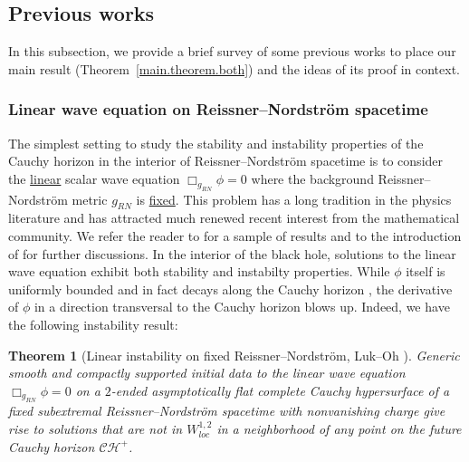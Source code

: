 \documentclass[10pt, reqno]{amsart}
\newtheorem{theorem}{Theorem}[section]
\theoremstyle{definition}
\theoremstyle{remark}
\numberwithin{equation}{section}
\newcommand{\0}{\emptyset}
\newcommand{\calC}{\mathcal C}
\newcommand{\calH}{\mathcal H}
\newcommand{\CH}{\calC \calH^{+}}		%
\begin{document}
\subsection{Previous works}\label{sec.previous.works}
In this subsection, we provide a brief survey of some previous works to place our main result (Theorem~\ref{main.theorem.both}) and the ideas of its proof in context.

\subsubsection{Linear wave equation on Reissner--Nordstr\"om spacetime}

The simplest setting to study the stability and instability properties of the Cauchy horizon in the interior of Reissner--Nordstr\"om spacetime is to consider the \underline{linear} scalar wave equation $\Box_{g_{RN}}\phi=0$ where the background Reissner--Nordstr\"om metric $g_{RN}$ is \underline{fixed}. This problem has a long tradition in the physics literature and has attracted much renewed recent interest from the mathematical community. We refer the reader to \cite{CH, DafShl, Fra, Gleeson, GSNS, Hintz, LS, McN, SP, Sbi.2} for a sample of results and to the introduction of \cite{LO.instab} for further discussions. In the interior of the black hole, solutions to the linear wave equation exhibit both stability and instabilty properties. While $\phi$ itself is uniformly bounded and in fact decays along the Cauchy horizon \cite{Fra, Hintz}, the derivative of $\phi$ in a direction transversal to the Cauchy horizon blows up. Indeed, we have the following instability result:

\begin{theorem}[Linear instability on fixed Reissner--Nordstr\"om, Luk--Oh \cite{LO.instab}]\label{linear.thm}
Generic smooth and compactly supported initial data to the linear wave equation $\Box_{g_{RN}}\phi=0$ on a $2$-ended asymptotically flat complete Cauchy hypersurface of a fixed subextremal Reissner--Nordstr\"om spacetime with nonvanishing charge give rise to solutions that are not in $W^{1,2}_{loc}$ in a neighborhood of any point on the future Cauchy horizon $\CH$.
\end{theorem}
\end{document}
